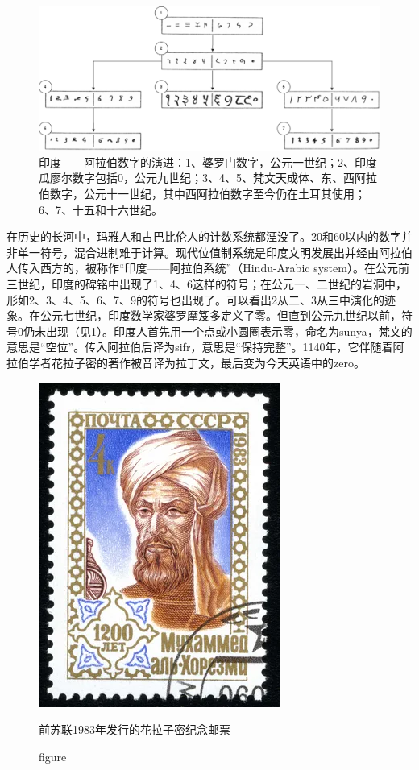 \documentclass[b5paper]{ctexart}
\begin{document}
\begin{figure}[htbp]
 \centering
 \includegraphics[scale=0.3]{img/Hindu-arabic-num}
 \caption{印度——阿拉伯数字的演进：1、婆罗门数字，公元一世纪；2、印度瓜廖尔数字包括0，公元九世纪；3、4、5、梵文天成体、东、西阿拉伯数字，公元十一世纪，其中西阿拉伯数字至今仍在土耳其使用；6、7、十五和十六世纪。}
 \label{fig:hindu-arabic-numerals}
\end{figure}

   \label{sec:hindu-arabic-numerals}
在历史的长河中，玛雅人和古巴比伦人的计数系统都湮没了。20和60以内的数字并非单一符号，混合进制难于计算。现代位值制系统是印度文明发展出并经由阿拉伯人传入西方的，被称作“印度——阿拉伯系统”（Hindu-Arabic system）。在公元前三世纪，印度的碑铭中出现了1、4、6这样的符号；在公元一、二世纪的岩洞中，形如2、3、4、5、6、7、9的符号也出现了。可以看出2从二、3从三中演化的迹象。在公元七世纪，印度数学家婆罗摩笈多定义了零\cite{MacTutor-Brahmagupta-2000}。但直到公元九世纪以前，符号0仍未出现（见\cref{fig:hindu-arabic-numerals}）。印度人首先用一个点或小圆圈表示零，命名为sunya，梵文的意思是“空位”。传入阿拉伯后译为sifr，意思是“保持完整”。1140年，它伴随着阿拉伯学者花拉子密的著作被音译为拉丁文，最后变为今天英语中的zero。

\begin{figure}[htbp]
 \centering
 \includegraphics[scale=0.3]{img/Khwarizmi}
 \caption{figure}{前苏联1983年发行的花拉子密纪念邮票}
 \label{fig:kwarizmi}
\end{figure}
\end{document}
